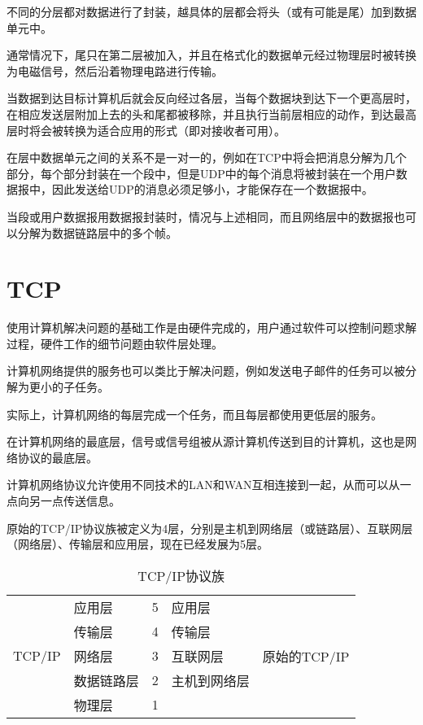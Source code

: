 不同的分层都对数据进行了封装，越具体的层都会将头（或有可能是尾）加到数据单元中。

通常情况下，尾只在第二层被加入，并且在格式化的数据单元经过物理层时被转换为电磁信号，然后沿着物理电路进行传输。

当数据到达目标计算机后就会反向经过各层，当每个数据块到达下一个更高层时，在相应发送层附加上去的头和尾都被移除，并且执行当前层相应的动作，到达最高层时将会被转换为适合应用的形式（即对接收者可用）。

在层中数据单元之间的关系不是一对一的，例如在TCP中将会把消息分解为几个部分，每个部分封装在一个段中，但是UDP中的每个消息将被封装在一个用户数据报中，因此发送给UDP的消息必须足够小，才能保存在一个数据报中。

当段或用户数据报用数据报封装时，情况与上述相同，而且网络层中的数据报也可以分解为数据链路层中的多个帧。






\section{TCP}


使用计算机解决问题的基础工作是由硬件完成的，用户通过软件可以控制问题求解过程，硬件工作的细节问题由软件层处理。

计算机网络提供的服务也可以类比于解决问题，例如发送电子邮件的任务可以被分解为更小的子任务。

实际上，计算机网络的每层完成一个任务，而且每层都使用更低层的服务。

在计算机网络的最底层，信号或信号组被从源计算机传送到目的计算机，这也是网络协议的最底层。

计算机网络协议允许使用不同技术的LAN和WAN互相连接到一起，从而可以从一点向另一点传送信息。

原始的TCP/IP协议族被定义为4层，分别是主机到网络层（或链路层）、互联网层（网络层）、传输层和应用层，现在已经发展为5层。

\begin{table}[htbp]
\centering
\caption{TCP/IP协议族}
\begin{tabular}{|l|l|l|l|l|}
\hline
	& 应用层 & 5 & 应用层 & \\ \cline{2-4}
	&传输层 & 4 & 传输层 & \\ \cline{2-4}
TCP/IP&网络层 & 3 & 互联网层 & 原始的TCP/IP\\ \cline{2-4}
	&数据链路层 & 2 & 主机到网络层 & \\ \cline{2-4}
	&物理层 & 1 & & \\
\hline
\end{tabular}
\end{table}

